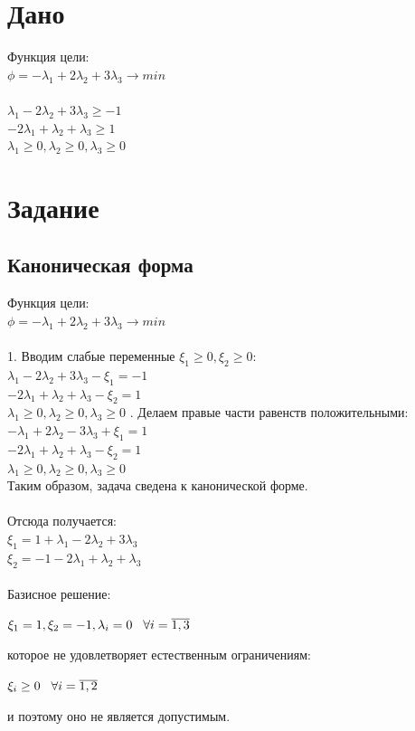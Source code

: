\documentclass[14pt,a4paper,fleqn]{extarticle}
\begin{document}
	\section*{Дано}
	Функция цели:\\
	$\phi = -\lambda_1 + 2\lambda_2 + 3\lambda_3 \longrightarrow min$\\\\
	$\lambda_1 - 2\lambda_2 + 3\lambda_3 \geq -1$\\
	$-2\lambda_1 + \lambda_2 + \lambda_3 \geq 1$\\
	$\lambda_1 \geq 0, \lambda_2 \geq 0, \lambda_3 \geq 0$
	\section*{Задание}
	\subsection*{Каноническая форма}
	Функция цели:\\
	$\phi = -\lambda_1 + 2\lambda_2 + 3\lambda_3 \longrightarrow min$\\\\
	1. Вводим слабые переменные $\xi_1 \geq 0, \xi_2 \geq 0$:\\
	$\lambda_1 - 2\lambda_2 + 3\lambda_3 - \xi_1 = -1$\\
	$-2\lambda_1 + \lambda_2 + \lambda_3 - \xi_2 = 1$\\
	$\lambda_1 \geq 0, \lambda_2 \geq 0, \lambda_3 \geq 0$
	. Делаем правые части равенств положительными:\\
	$-\lambda_1 + 2\lambda_2 - 3\lambda_3 + \xi_1 = 1$\\
	$-2\lambda_1 + \lambda_2 + \lambda_3 - \xi_2 = 1$\\
	$\lambda_1 \geq 0, \lambda_2 \geq 0, \lambda_3 \geq 0$\\
	
	Таким образом, задача сведена к канонической форме.\\\\
	Отсюда получается:\\
	$\xi_1 = 1 + \lambda_1 - 2\lambda_2 + 3\lambda_3$\\
	$\xi_2 = -1 - 2\lambda_1 + \lambda_2 + \lambda_3$\\\\
	Базисное решение:
	\begin{center}
		$\xi_1 = 1, \xi_2 = -1, \lambda_i = 0 \hspace*{0.3cm} \forall i = \overline{1,3}$
	\end{center}
	которое не удовлетворяет естественным ограничениям:
	\begin{center}
		$\xi_i \geq 0 \hspace*{0.3cm} \forall i = \overline{1,2}$
	\end{center}
	и поэтому оно не является допустимым.
\end{document}
